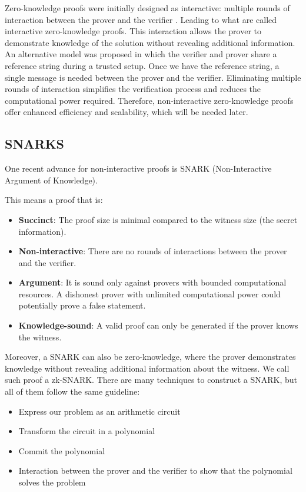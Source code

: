Zero-knowledge proofs were initially designed as interactive: multiple rounds of interaction between the prover and the verifier \cite{GMR89}.
Leading to what are called interactive zero-knowledge proofs. This interaction allows the prover to demonstrate knowledge of the solution without revealing additional information.
An alternative model was proposed in which the verifier and prover share a reference string during a trusted setup. Once we have the reference string, a single message is needed between the prover and the verifier.
Eliminating multiple rounds of interaction simplifies the verification process and reduces the computational power required.\cite{BFM88}
Therefore, non-interactive zero-knowledge proofs offer enhanced efficiency and scalability, which will be needed later. 


\subsection{SNARKS}
One recent advance for non-interactive proofs is SNARK (Non-Interactive Argument of Knowledge).


This means a proof that is:
\begin{itemize}
\item \textbf{Succinct}: The proof size is minimal compared to the witness size (the secret information).
\item \textbf{Non-interactive}: There are no rounds of interactions between the prover and the verifier.
\item \textbf{Argument}: It is sound only against provers with bounded computational resources. A dishonest prover with unlimited computational power could potentially prove a false statement.
\item \textbf{Knowledge-sound}: A valid proof can only be generated if the prover knows the witness. \cite{NZ20}
\end{itemize}

Moreover, a SNARK can also be zero-knowledge, where the prover demonstrates knowledge without revealing additional information about the witness. We call such proof a zk-SNARK.
There are many techniques to construct a SNARK, but all of them follow the same guideline:
\begin{itemize}
   \item Express our problem as an arithmetic circuit
   \item Transform the circuit in a polynomial
   \item Commit the polynomial
   \item Interaction between the prover and the verifier to show that the polynomial solves the problem
 \end{itemize}

